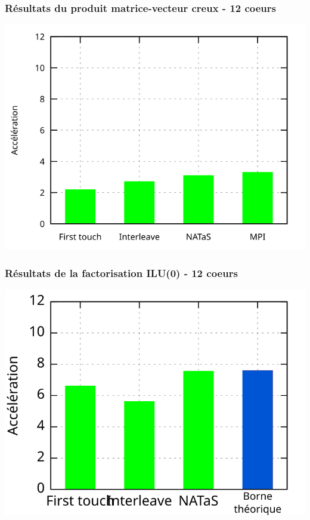 \documentclass{beamer}
\begin{document}
\begin{frame}
  \frametitle{Résultats du produit matrice-vecteur creux - 12 coeurs}

  \centerline{\includegraphics[width=0.8\linewidth]{res_ilu_spmv}}

\end{frame}

\begin{frame}
  \frametitle{Résultats de la factorisation ILU(0) - 12 coeurs}

  \centerline{\includegraphics[width=0.8\linewidth]{res_ilu_nas}}

\end{frame}
\end{document}
